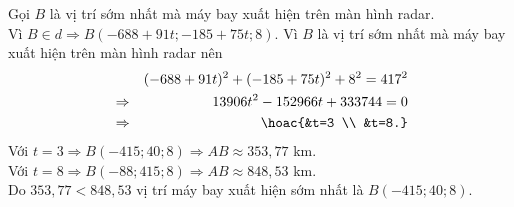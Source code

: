 \begin{bt}
{		Gọi $B$ là vị trí sớm nhất mà máy bay xuất hiện trên màn hình radar. \\
		Vì $B \in d \Rightarrow B(-688+91 t ;-185+75 t ; 8)$.
		Vì $B$ là vị trí sớm nhất mà máy bay xuất hiện trên màn hình radar nên
		\begin{eqnarray*}
			&&(-688+91 t)^2+(-185+75 t)^2+8^2=417^2\\
			&\Rightarrow &13906 t^2-152966 t+333744=0\\
			&\Rightarrow &\hoac{&t=3 \\
				&t=8.}
		\end{eqnarray*}
		Với $t=3 \Rightarrow B(-415 ; 40 ; 8) \Rightarrow A B \approx 353{,}77$ km. \\
		Với $t=8 \Rightarrow B(-88 ; 415 ; 8) \Rightarrow A B \approx 848{,}53$ km.\\
		Do $353{,}77<848{,}53$ vị trí máy bay xuất hiện sớm nhất là $B(-415 ; 40 ; 8)$.
		
	}
\end{bt}

